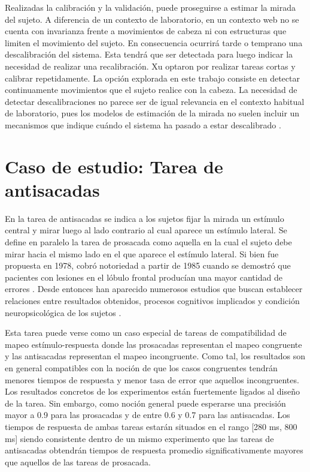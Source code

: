 Realizadas la calibración y la validación, puede proseguirse a estimar la
mirada del sujeto.
A diferencia de un contexto de laboratorio, en un contexto web no se cuenta
con invarianza frente a movimientos de cabeza ni con estructuras que limiten el
movimiento del sujeto.
En consecuencia ocurrirá tarde o temprano una descalibración del sistema.
Esta tendrá que ser detectada para luego indicar la necesidad de realizar una
recalibración.
Xu \etal \cite{xu_2015_turker_gaze} optaron por realizar tareas cortas y
calibrar repetidamente.
La opción explorada en este trabajo consiste en detectar continuamente
movimientos que el sujeto realice con la cabeza.
La necesidad de detectar descalibraciones no parece ser de igual relevancia en
el contexto habitual de laboratorio, pues los modelos de estimación de la
mirada no suelen incluir un mecanismos que indique cuándo el sistema ha pasado
a estar descalibrado \cite{hansen_2009_eye_of_the_beholder}.

\section{Caso de estudio: Tarea de antisacadas}

En la tarea de antisacadas se indica a los sujetos fijar la mirada un estímulo
central y mirar luego al lado contrario al cual aparece un estímulo lateral.
Se define en paralelo la tarea de prosacada como aquella en la cual el sujeto
debe mirar hacia el mismo lado en el que aparece el estímulo lateral.
Si bien fue propuesta en 1978, cobró notoriedad a partir de 1985 cuando se
demostró que pacientes con lesiones en el lóbulo frontal producían una mayor
cantidad de errores \cite{smyrnis_2002_big_sample}.
Desde entonces han aparecido numerosos estudios que buscan establecer
relaciones entre resultados obtenidos, procesos cognitivos implicados y
condición neuropsicológica de los sujetos \cite{munoz_2004_look_away,
unsworth_2011_distribution_analysis, olincy_1997_age_diminishes_performance,
smyrnis_2002_big_sample, unsworth_2021_working_memory_capacity,
plomecka_2020_retest_reliability}.

Esta tarea puede verse como un caso especial de tareas de compatibilidad de
mapeo estímulo-respuesta \cite{munoz_2004_look_away} donde las prosacadas
representan el mapeo congruente y las antisacadas representan el mapeo
incongruente.
Como tal, los resultados son en general compatibles con la noción de que los
casos congruentes tendrán menores tiempos de respuesta y menor tasa de error
que aquellos incongruentes.
Los resultados concretos de los experimentos están fuertemente ligados al
diseño de la tarea.
Sin embargo, como noción general puede esperarse una precisión mayor a 0.9 para
las prosacadas y de entre 0.6 y 0.7 para las antisacadas.
Los tiempos de respuesta de ambas tareas estarán situados en el rango [280 ms,
800 ms] siendo consistente dentro de un mismo experimento que las tareas de
antisacadas obtendrán tiempos de respuesta promedio significativamente mayores
que aquellos de las tareas de prosacada.

